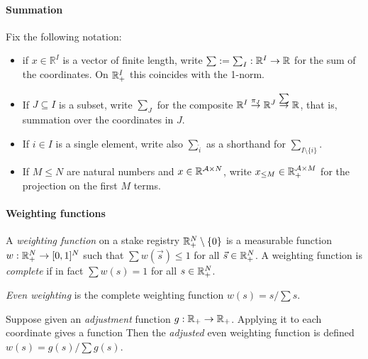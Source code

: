 \paragraph{Summation}

Fix the following notation:
\begin{itemize}
  \item if $x\in \mathbb{R}^I$ is a vector of finite length, write $\sum:=\sum_I:\mathbb{R}^I\rightarrow\mathbb{R}$ for the sum of the coordinates. On $\mathbb{R}_+^I$ this coincides with the 1-norm.
  \item If $J\subseteq I$ is a subset, write $\sum_J$ for the composite $\mathbb{R}^I\stackrel{\pi_J}{\rightarrow}\mathbb{R}^J\stackrel{\sum}{\rightarrow}\mathbb{R}$, that is, summation over the coordinates in $J$.
  \item If $i\in I$ is a single element, write also $\sum_{\hat{i}}$ as a shorthand for $\sum_{I\setminus\{i\}}$.
  \item If $M\leq N$ are natural numbers and $x\in\mathbb{R}^{\mathcal{A}\times N}$, write $x_{\leq M}\in \mathbb{R}_+^{\mathcal{A}\times M}$ for the projection on the first $M$ terms.
\end{itemize}

\paragraph{Weighting functions}

\begin{definition}

  A \emph{weighting function} on a stake registry $\mathbb{R}_+^N\setminus\{0\}$ is a measurable function $w:\mathbb{R}_+^N\rightarrow[0,1]^N$ such that $\sum w(\vec{s}) \leq 1$ for all $\vec{s}\in \mathbb{R}_+^N$.
  A weighting function is \emph{complete} if in fact $\sum w(s) = 1$ for all $s\in \mathbb{R}_+^N$.

\end{definition}

\begin{example}
  \emph{Even weighting} is the complete weighting function $w(s) = s/\sum s$.
\end{example}


\begin{example}

  Suppose given an \emph{adjustment} function $g:\mathbb{R}_+\rightarrow\mathbb{R}_+$. 
  Applying it to each coordinate gives a function
  Then the \emph{adjusted} even weighting function is defined $w(s) = g(s)/\sum g(s)$.

\end{example}

